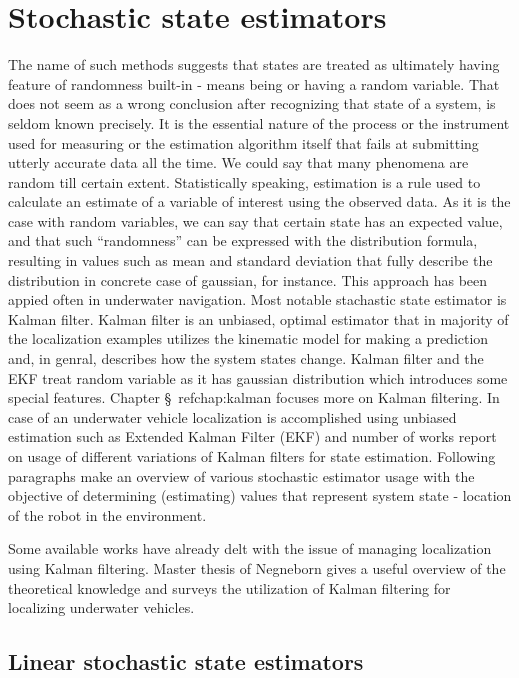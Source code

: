 \section{Stochastic state estimators} \label{sec:stochastic-methods}
The name of such methods suggests that states are treated as ultimately having feature of randomness built-in - means being or having a random variable. That does not seem as a wrong conclusion after recognizing that state of a system, is seldom known precisely. It is the essential nature of the process or the instrument used for measuring or the estimation algorithm itself that fails at submitting utterly accurate data all the time. We could say that many phenomena are random till certain extent. Statistically speaking, estimation is a rule used to calculate an estimate of a variable of interest using the observed data. As it is the case with random variables, we can say that certain state has an expected value, and that such ``randomness'' can be expressed with the distribution formula, resulting in values such as mean and standard deviation that fully describe the distribution in concrete case of gaussian, for instance. This approach has been appied often in underwater navigation. Most notable stachastic state estimator is Kalman filter. Kalman filter is an unbiased, optimal estimator that in majority of the localization examples utilizes the kinematic model for making a prediction and, in genral, describes how the system states change. Kalman filter and the EKF treat random variable as it has gaussian distribution which introduces some special features. Chapter \S~ref{chap:kalman} focuses more on Kalman filtering. In case of an underwater vehicle localization is accomplished using unbiased estimation such as Extended Kalman Filter (EKF) and number of works report on usage of different variations of Kalman filters for state estimation. Following paragraphs make an overview of various stochastic estimator usage with the objective of determining (estimating) values that represent system state - location of the robot in the environment. 

Some available works have already delt with the issue of managing localization using Kalman filtering. Master thesis of Negneborn \cite{negenborn03} gives a useful overview of the theoretical knowledge and surveys the utilization of Kalman filtering for localizing underwater vehicles. 

\subsection{Linear stochastic state estimators}

